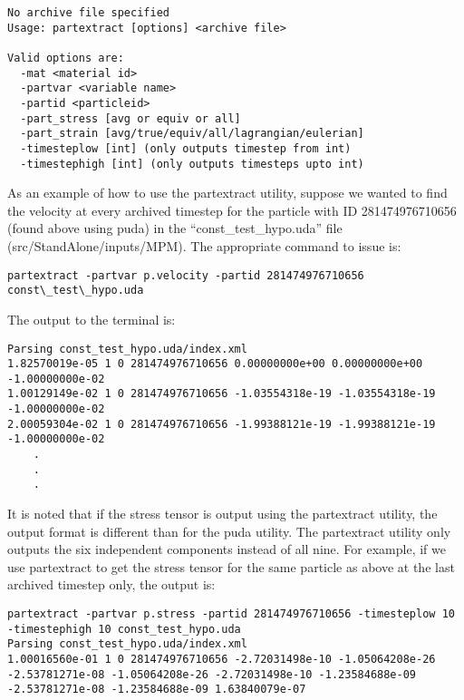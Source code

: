 \begin{Verbatim}[fontsize=\footnotesize]
No archive file specified
Usage: partextract [options] <archive file>

Valid options are:
  -mat <material id>
  -partvar <variable name>
  -partid <particleid>
  -part_stress [avg or equiv or all]
  -part_strain [avg/true/equiv/all/lagrangian/eulerian]
  -timesteplow [int] (only outputs timestep from int)
  -timestephigh [int] (only outputs timesteps upto int)
\end{Verbatim}

As an example of how to use the partextract utility, suppose we wanted
to find the velocity at every archived timestep for the particle with
ID 281474976710656 (found above using puda) in the
``const\_test\_hypo.uda'' file (src/StandAlone/inputs/MPM).  The
appropriate command to issue is:

\begin{Verbatim}[fontsize=\footnotesize]
partextract -partvar p.velocity -partid 281474976710656 const\_test\_hypo.uda
\end{Verbatim}

The output to the terminal is:

\begin{Verbatim}[fontsize=\footnotesize]
Parsing const_test_hypo.uda/index.xml
1.82570019e-05 1 0 281474976710656 0.00000000e+00 0.00000000e+00 -1.00000000e-02
1.00129149e-02 1 0 281474976710656 -1.03554318e-19 -1.03554318e-19 -1.00000000e-02
2.00059304e-02 1 0 281474976710656 -1.99388121e-19 -1.99388121e-19 -1.00000000e-02
	.
	.
	.
\end{Verbatim}

It is noted that if the stress tensor is output using the partextract utility, the output format is different than for the puda utility.  The partextract utility only outputs the six independent components instead of all nine.  For example, if we use partextract to get the stress tensor for the same particle as above at the last archived timestep only, the output is:

\begin{Verbatim}[fontsize=\footnotesize]
partextract -partvar p.stress -partid 281474976710656 -timesteplow 10 -timestephigh 10 const_test_hypo.uda
Parsing const_test_hypo.uda/index.xml
1.00016560e-01 1 0 281474976710656 -2.72031498e-10 -1.05064208e-26 -2.53781271e-08 -1.05064208e-26 -2.72031498e-10 -1.23584688e-09 -2.53781271e-08 -1.23584688e-09 1.63840079e-07
\end{Verbatim}

